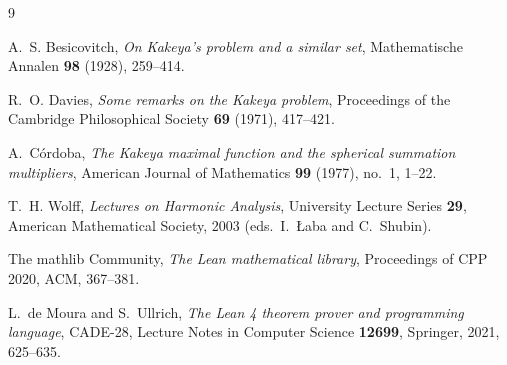 \documentclass[11pt,a4paper]{article}
\theoremstyle{definition}
\theoremstyle{remark}
\begin{document}
\begin{thebibliography}{9}

A.~S. Besicovitch,
\emph{On Kakeya's problem and a similar set},
Mathematische Annalen \textbf{98} (1928), 259--414.

R.~O. Davies,
\emph{Some remarks on the Kakeya problem},
Proceedings of the Cambridge Philosophical Society \textbf{69} (1971), 417--421.

A.~C\'ordoba,
\emph{The Kakeya maximal function and the spherical summation multipliers},
American Journal of Mathematics \textbf{99} (1977), no.~1, 1--22.

T.~H. Wolff,
\emph{Lectures on Harmonic Analysis},
University Lecture Series \textbf{29}, American Mathematical Society, 2003
(eds.~I.~{\L}aba and C.~Shubin).

The mathlib Community,
\emph{The Lean mathematical library},
Proceedings of CPP 2020, ACM, 367--381.

L.~de Moura and S.~Ullrich,
\emph{The Lean 4 theorem prover and programming language},
CADE-28, Lecture Notes in Computer Science \textbf{12699}, Springer, 2021, 625--635.

\end{thebibliography}
\end{document}
